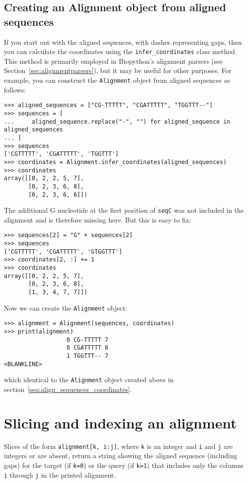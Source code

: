 \subsection{Creating an Alignment object from aligned sequences}
\label{seq:align_infer_coordinates}

If you start out with the aligned sequences, with dashes representing gaps, then you can calculate the coordinates using the \verb|infer_coordinates| class method. This method is primarily employed in Biopython's alignment parsers (see Section~\ref{sec:alignmentparsers}), but it may be useful for other purposes. For example, you can construct the \verb|Alignment| object from aligned sequences as follows:
\begin{verbatim}
>>> aligned_sequences = ["CG-TTTTT", "CGATTTTT", "TGGTTT--"]
>>> sequences = [
...     aligned_sequence.replace("-", "") for aligned_sequence in aligned_sequences
... ]
>>> sequences
['CGTTTTT', 'CGATTTTT', 'TGGTTT']
>>> coordinates = Alignment.infer_coordinates(aligned_sequences)
>>> coordinates
array([[0, 2, 2, 5, 7],
       [0, 2, 3, 6, 8],
       [0, 2, 3, 6, 6]])
\end{verbatim}
The additional G nucleotide at the first position of \verb|seqC| was not included in the alignment and is therefore missing here. But this is easy to fix:
\begin{verbatim}
>>> sequences[2] = "G" + sequences[2]
>>> sequences
['CGTTTTT', 'CGATTTTT', 'GTGGTTT']
>>> coordinates[2, :] += 1
>>> coordinates
array([[0, 2, 2, 5, 7],
       [0, 2, 3, 6, 8],
       [1, 3, 4, 7, 7]])
\end{verbatim}
Now we can create the \verb|Alignment| object:
\begin{verbatim}
>>> alignment = Alignment(sequences, coordinates)
>>> print(alignment)
                  0 CG-TTTTT 7
                  0 CGATTTTT 8
                  1 TGGTTT-- 7
<BLANKLINE>
\end{verbatim}
which identical to the \verb|Alignment| object created above in section~\ref{seq:align_sequences_coordinates}.


\section{Slicing and indexing an alignment}

Slices of the form \verb+alignment[k, i:j]+, where \verb+k+ is an integer and \verb+i+ and \verb+j+ are integers or are absent, return a string showing the aligned sequence (including gaps) for the target (if \verb+k=0+) or the query (if \verb+k=1+) that includes only the columns \verb+i+ through \verb+j+ in the printed alignment.

